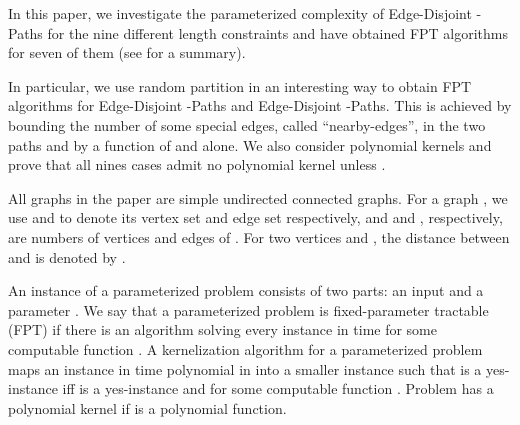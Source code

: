 \documentclass{llncs}
\begin{document}
In this paper, we investigate the parameterized complexity of {\sc Edge-Disjoint -Paths}
for the nine different length constraints and have obtained FPT algorithms for seven of them 
(see  for a summary).

In particular, we use random partition in an interesting way to obtain FPT algorithms for
{\sc Edge-Disjoint -Paths} and {\sc Edge-Disjoint -Paths}.
This is achieved by bounding the number of some special edges, called ``nearby-edges'',
in the two paths  and  by a function of  and  alone.
We also consider polynomial kernels and prove that all nines cases admit no polynomial kernel 
unless . \\


 All graphs in the paper are simple undirected connected graphs. 
For a graph , we use  and  to denote 
its vertex set and edge set respectively,
and  and , respectively, are numbers of vertices and edges of . 
For two vertices  and , the distance between  and  is denoted by . 

An instance  of a parameterized problem  
consists of two parts: an input  and a parameter . 
We say that a parameterized problem  is fixed-parameter tractable (FPT) if 
there is an algorithm solving every instance  in time  
for some computable function . 
A kernelization algorithm for a parameterized problem  maps an instance  
in time polynomial in  into a smaller instance  
such that  is a yes-instance iff  is a yes-instance 
and  for some computable function . 
Problem  has a polynomial kernel if  is a polynomial function. 
\end{document}
